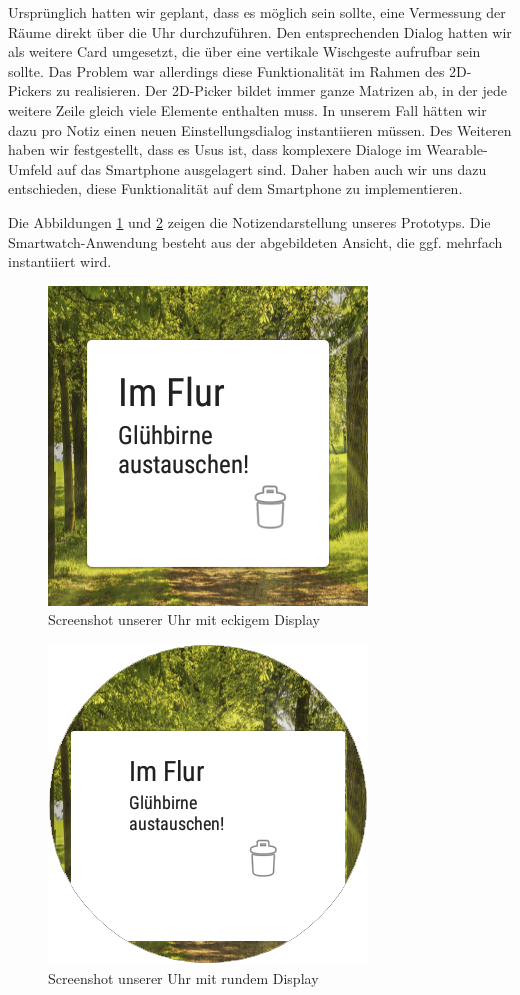 Ursprünglich hatten wir geplant, dass es möglich sein sollte, eine Vermessung der Räume direkt über die Uhr durchzuführen. Den entsprechenden Dialog hatten wir als weitere Card umgesetzt, die über eine vertikale Wischgeste aufrufbar sein sollte. Das Problem war allerdings diese Funktionalität im Rahmen des 2D-Pickers
zu realisieren. Der 2D-Picker bildet immer ganze Matrizen ab, in der jede weitere Zeile gleich viele Elemente enthalten muss. In unserem Fall hätten wir dazu pro Notiz einen neuen Einstellungsdialog instantiieren müssen.  Des Weiteren haben wir festgestellt, dass es Usus ist, dass komplexere Dialoge im Wearable-Umfeld auf das Smartphone ausgelagert sind. Daher haben auch wir uns dazu entschieden, diese Funktionalität auf dem Smartphone zu implementieren.

Die Abbildungen \ref{fig:ScreenshotWatchEckig} und \ref{fig:ScreenshotWatchRund} zeigen
die Notizendarstellung unseres Prototyps. Die Smartwatch-Anwendung besteht aus der abgebildeten Ansicht, die ggf. mehrfach instantiiert wird.

\begin{figure}[H]
\centering
\includegraphics[width=0.3\linewidth]{../Bilder/ScreenshotWatchEckig}
\caption{Screenshot unserer Uhr mit eckigem Display}
\label{fig:ScreenshotWatchEckig}
\end{figure}

\begin{figure}[H]
\centering
\includegraphics[width=0.3\linewidth]{../Bilder/ScreenshotWatchRund}
\caption{Screenshot unserer Uhr mit rundem Display}
\label{fig:ScreenshotWatchRund}
\end{figure}

